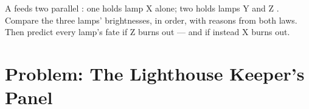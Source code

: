 \begin{exercise}[$\star\star\star$]\label{exo:g7:circuits-series-parallel:12}
A  feeds two parallel :  one holds lamp X
alone;  two holds lamps Y and Z . Compare the
three lamps' brightnesses, in order, with reasons from both
laws. Then predict every lamp's fate if Z burns out --- and if
instead X burns out.
\end{exercise}

\section{Problem: The Lighthouse Keeper's Panel}

